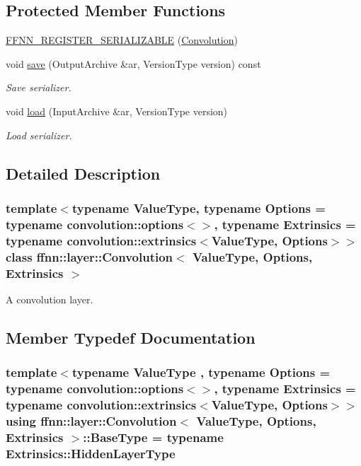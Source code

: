 \subsection*{Protected Member Functions}
\begin{DoxyCompactItemize}
\item 
\hyperlink{classffnn_1_1layer_1_1_convolution_aeb9c1983ad3858070fe1d31c3ab2f8c0}{F\-F\-N\-N\-\_\-\-R\-E\-G\-I\-S\-T\-E\-R\-\_\-\-S\-E\-R\-I\-A\-L\-I\-Z\-A\-B\-L\-E} (\hyperlink{classffnn_1_1layer_1_1_convolution}{Convolution})
\item 
void \hyperlink{classffnn_1_1layer_1_1_convolution_a06e3973928e3b0f7ef8b0c7aabcf93c8}{save} (Output\-Archive \&ar, Version\-Type version) const 
\begin{DoxyCompactList}\small\item\em Save serializer. \end{DoxyCompactList}\item 
void \hyperlink{classffnn_1_1layer_1_1_convolution_af002187ef6ca18c4071d88c9fb1bb002}{load} (Input\-Archive \&ar, Version\-Type version)
\begin{DoxyCompactList}\small\item\em Load serializer. \end{DoxyCompactList}\end{DoxyCompactItemize}


\subsection{Detailed Description}
\subsubsection*{template$<$typename Value\-Type, typename Options = typename convolution\-::options$<$$>$, typename Extrinsics = typename convolution\-::extrinsics$<$\-Value\-Type, Options$>$$>$class ffnn\-::layer\-::\-Convolution$<$ Value\-Type, Options, Extrinsics $>$}

A convolution layer. 

\subsection{Member Typedef Documentation}
\hypertarget{classffnn_1_1layer_1_1_convolution_a30a3026202f29a601e539c80824fcf1f}{
\subsubsection[{Base\-Type}]{\setlength{\rightskip}{0pt plus 5cm}template$<$typename Value\-Type , typename Options  = typename convolution\-::options$<$$>$, typename Extrinsics  = typename convolution\-::extrinsics$<$\-Value\-Type, Options$>$$>$ using {\bf ffnn\-::layer\-::\-Convolution}$<$ Value\-Type, Options, Extrinsics $>$\-::{\bf Base\-Type} =  typename Extrinsics\-::\-Hidden\-Layer\-Type}}\label{classffnn_1_1layer_1_1_convolution_a30a3026202f29a601e539c80824fcf1f}


